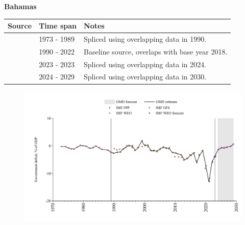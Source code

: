 \documentclass[12pt,a4paper,landscape]{article}
\begin{document}
\begin{adjustbox}{max totalsize={\paperwidth}{\paperheight},center}
\begin{minipage}[t][\textheight][t]{\textwidth}
\vspace*{0.5cm}
{}
\begin{center}
{\Large\bfseries Bahamas}
\end{center}
\vspace{0.5cm}
\begin{table}[H]
\centering
\small
\begin{tabular}{|l|l|l|}
\hline
\textbf{Source} & \textbf{Time span} & \textbf{Notes} \\
\hline
\rowcolor{white}\cite{IMF_GFS}& 1973 - 1989 &Spliced using overlapping data in 1990.\\
\rowcolor{lightgray}\cite{IMF_WEO}& 1990 - 2022 &Baseline source, overlaps with base year 2018.\\
\rowcolor{white}\cite{IMF_GFS}& 2023 - 2023 &Spliced using overlapping data in 2024.\\
\rowcolor{lightgray}\cite{IMF_WEO_forecast}& 2024 - 2029 &Spliced using overlapping data in 2030.\\
\hline
\end{tabular}
\end{table}
\begin{figure}[H]
\centering
\includegraphics[width=\textwidth,height=0.6\textheight,keepaspectratio]{graphs/BHS_govdef_GDP.pdf}
\end{figure}
\end{minipage}
\end{adjustbox}
\end{document}

